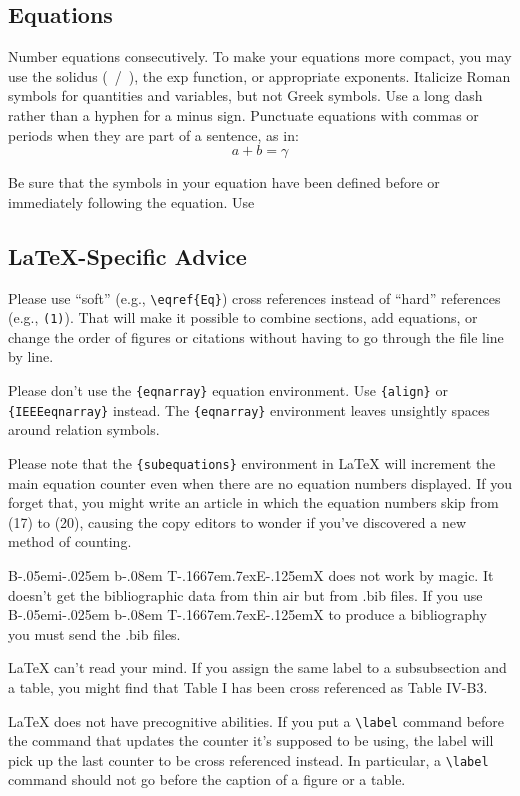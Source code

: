 \documentclass[conference]{IEEEtran}
\def\BibTeX{{\rm B\kern-.05em{\sc i\kern-.025em b}\kern-.08em
    T\kern-.1667em\lower.7ex\hbox{E}\kern-.125emX}}
\begin{document}
\subsection{Equations}
Number equations consecutively. To make your 
equations more compact, you may use the solidus (~/~), the exp function, or 
appropriate exponents. Italicize Roman symbols for quantities and variables, 
but not Greek symbols. Use a long dash rather than a hyphen for a minus 
sign. Punctuate equations with commas or periods when they are part of a 
sentence, as in:
\begin{equation}
a+b=\gamma\label{eq}
\end{equation}

Be sure that the 
symbols in your equation have been defined before or immediately following 
the equation. Use 

\subsection{\LaTeX-Specific Advice}

Please use ``soft'' (e.g., \verb|\eqref{Eq}|) cross references instead
of ``hard'' references (e.g., \verb|(1)|). That will make it possible
to combine sections, add equations, or change the order of figures or
citations without having to go through the file line by line.

Please don't use the \verb|{eqnarray}| equation environment. Use
\verb|{align}| or \verb|{IEEEeqnarray}| instead. The \verb|{eqnarray}|
environment leaves unsightly spaces around relation symbols.

Please note that the \verb|{subequations}| environment in {\LaTeX}
will increment the main equation counter even when there are no
equation numbers displayed. If you forget that, you might write an
article in which the equation numbers skip from (17) to (20), causing
the copy editors to wonder if you've discovered a new method of
counting.

{\BibTeX} does not work by magic. It doesn't get the bibliographic
data from thin air but from .bib files. If you use {\BibTeX} to produce a
bibliography you must send the .bib files. 

{\LaTeX} can't read your mind. If you assign the same label to a
subsubsection and a table, you might find that Table I has been cross
referenced as Table IV-B3. 

{\LaTeX} does not have precognitive abilities. If you put a
\verb|\label| command before the command that updates the counter it's
supposed to be using, the label will pick up the last counter to be
cross referenced instead. In particular, a \verb|\label| command
should not go before the caption of a figure or a table.
\end{document}
